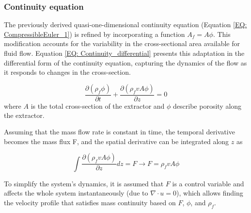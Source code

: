 \documentclass[../Article_Model_Parameters.tex]{subfiles}
\begin{document}
		
	\subsubsection{Continuity equation} \label{CH: Continuity}
	 
	
	The previously derived quasi-one-dimensional continuity equation (Equation \ref{EQ: CompressibleEuler_1}) is refined by incorporating a function $A_f = A\phi$. This modification accounts for the variability in the cross-sectional area available for fluid flow. Equation \ref{EQ: Continuity_differential} presents this adaptation in the differential form of the continuity equation, capturing the dynamics of the flow as it responds to changes in the cross-section.
	
	{\footnotesize
		\begin{equation} \label{EQ: Continuity_differential}
			\frac{\partial (\rho_f \phi)}{\partial t} + \frac{\partial (\rho_f v A\phi)}{\partial z} = 0
		\end{equation}
	}
	where $A$ is the total cross-section of the extractor and $\phi$ describe porosity along the extractor.
	
	
	Assuming that the mass flow rate is constant in time, the temporal derivative becomes the mass flux F, and the spatial derivative can be integrated along $z$ as
	
	{\footnotesize
		\begin{equation}
			\int \frac{\partial (\rho_f v A \phi )}{\partial z} dz = F \rightarrow F=\rho_f v A\phi
		\end{equation}
	}
	
	To simplify the system's dynamics, it is assumed that $F$ is a control variable and affects the whole system instantaneously (due to $\nabla \cdot u = 0$), which allows finding the velocity profile that satisfies mass continuity based on $F$, $\phi$, and $\rho_f$.
	
\end{document}

